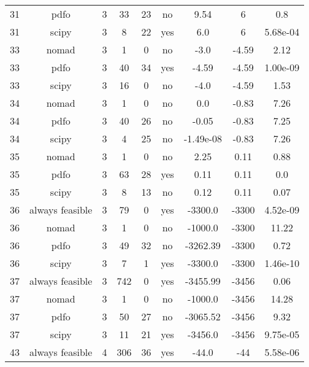 \begin{scriptsize}
\begin{center}
\begin{longtable}{ccccccccc}
 31 &            pdfo &  3 &     33 &     23 &      no &        9.54 &           6 &      0.8\\
 31 &           scipy &  3 &      8 &     22 &     yes &         6.0 &           6 & 5.68e-04\\
 33 &           nomad &  3 &      1 &      0 &      no &        -3.0 &       -4.59 &     2.12\\
 33 &            pdfo &  3 &     40 &     34 &     yes &       -4.59 &       -4.59 & 1.00e-09\\
 33 &           scipy &  3 &     16 &      0 &      no &        -4.0 &       -4.59 &     1.53\\
 34 &           nomad &  3 &      1 &      0 &      no &         0.0 &       -0.83 &     7.26\\
 34 &            pdfo &  3 &     40 &     26 &      no &       -0.05 &       -0.83 &     7.25\\
 34 &           scipy &  3 &      4 &     25 &      no &   -1.49e-08 &       -0.83 &     7.26\\
 35 &           nomad &  3 &      1 &      0 &      no &        2.25 &        0.11 &     0.88\\
 35 &            pdfo &  3 &     63 &     28 &     yes &        0.11 &        0.11 &      0.0\\
 35 &           scipy &  3 &      8 &     13 &      no &        0.12 &        0.11 &     0.07\\
 36 & always feasible &  3 &     79 &      0 &     yes &     -3300.0 &       -3300 & 4.52e-09\\
 36 &           nomad &  3 &      1 &      0 &      no &     -1000.0 &       -3300 &    11.22\\
 36 &            pdfo &  3 &     49 &     32 &      no &    -3262.39 &       -3300 &     0.72\\
 36 &           scipy &  3 &      7 &      1 &     yes &     -3300.0 &       -3300 & 1.46e-10\\
 37 & always feasible &  3 &    742 &      0 &     yes &    -3455.99 &       -3456 &     0.06\\
 37 &           nomad &  3 &      1 &      0 &      no &     -1000.0 &       -3456 &    14.28\\
 37 &            pdfo &  3 &     50 &     27 &      no &    -3065.52 &       -3456 &     9.32\\
 37 &           scipy &  3 &     11 &     21 &     yes &     -3456.0 &       -3456 & 9.75e-05\\
 43 & always feasible &  4 &    306 &     36 &     yes &       -44.0 &         -44 & 5.58e-06\\

\end{longtable}
\end{center}
\end{scriptsize}
